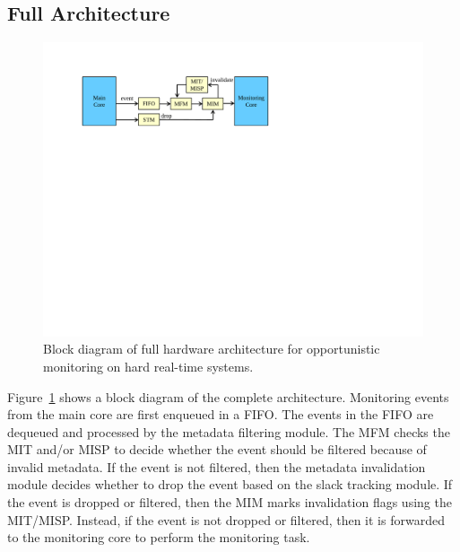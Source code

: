 \subsection{Full Architecture}
\label{sec:hwdrop.full_arch}

\begin{figure}
  \begin{center}
    \includegraphics[width=\columnwidth]{monitoring_hard_drop/figs/full_hw.pdf}
    \caption{Block diagram of full hardware architecture for opportunistic
    monitoring on hard real-time systems.}
    \label{fig:hwdrop.full_hw}
  \end{center}
\end{figure}

Figure~\ref{fig:hwdrop.full_hw} shows a block diagram of the complete
architecture.  Monitoring events from the main core are first enqueued in a
FIFO. The events in the FIFO are dequeued and processed by the metadata
filtering module. The MFM checks the MIT and/or MISP to decide whether the
event should be filtered because of invalid metadata. If the event is not
filtered, then the metadata invalidation module decides whether to drop the
event based on the slack tracking module. If the event is dropped or filtered,
then the MIM marks invalidation flags using the MIT/MISP. Instead, if the event
is not dropped or filtered, then it is forwarded to the monitoring core to
perform the monitoring task.
